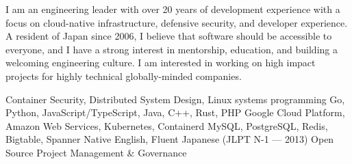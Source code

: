 \documentclass{resume}
\author{Ian M. Lewis}
\begin{document}
\maketitle

\vspace{-1.1cm}

\begin{category}{} %

    \citembullet{}I am an engineering leader with over 20 years of development
        experience with a focus on cloud-native infrastructure, defensive security,
        and developer experience. A resident of Japan since 2006, I believe that
        software should be accessible to everyone, and I have a strong interest in
        mentorship, education, and building a welcoming engineering culture. I am
        interested in working on high impact projects for highly technical
        globally-minded companies.

     Container Security, Distributed System Design, Linux
    systems programming
     Go, Python, JavaScript/TypeScript, Java, C++,
    Rust, PHP
     Google Cloud Platform, Amazon Web Services, Kubernetes,
    Containerd
     MySQL, PostgreSQL, Redis, Bigtable, Spanner
     Native English, Fluent Japanese (JLPT N-1 ---
    2013)
     Open Source Project Management \& Governance

\end{category}
\end{document}
